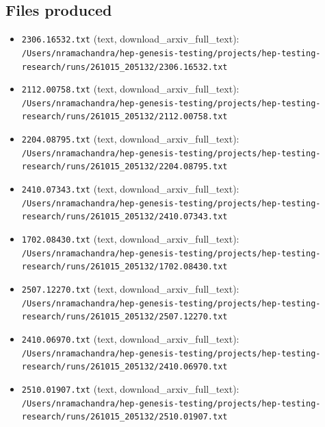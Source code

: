 \documentclass[11pt,a4paper]{article}
\begin{document}
\subsection{Files produced}
\begin{itemize}
  \item \texttt{2306.16532.txt} (text, download\_arxiv\_full\_text): \texttt{/\allowbreak{}Users/\allowbreak{}nramachandra/\allowbreak{}hep-genesis-testing/\allowbreak{}projects/\allowbreak{}hep-testing-research/\allowbreak{}runs/\allowbreak{}261015\_\allowbreak{}205132/\allowbreak{}2306.16532.txt}
  \item \texttt{2112.00758.txt} (text, download\_arxiv\_full\_text): \texttt{/\allowbreak{}Users/\allowbreak{}nramachandra/\allowbreak{}hep-genesis-testing/\allowbreak{}projects/\allowbreak{}hep-testing-research/\allowbreak{}runs/\allowbreak{}261015\_\allowbreak{}205132/\allowbreak{}2112.00758.txt}
  \item \texttt{2204.08795.txt} (text, download\_arxiv\_full\_text): \texttt{/\allowbreak{}Users/\allowbreak{}nramachandra/\allowbreak{}hep-genesis-testing/\allowbreak{}projects/\allowbreak{}hep-testing-research/\allowbreak{}runs/\allowbreak{}261015\_\allowbreak{}205132/\allowbreak{}2204.08795.txt}
  \item \texttt{2410.07343.txt} (text, download\_arxiv\_full\_text): \texttt{/\allowbreak{}Users/\allowbreak{}nramachandra/\allowbreak{}hep-genesis-testing/\allowbreak{}projects/\allowbreak{}hep-testing-research/\allowbreak{}runs/\allowbreak{}261015\_\allowbreak{}205132/\allowbreak{}2410.07343.txt}
  \item \texttt{1702.08430.txt} (text, download\_arxiv\_full\_text): \texttt{/\allowbreak{}Users/\allowbreak{}nramachandra/\allowbreak{}hep-genesis-testing/\allowbreak{}projects/\allowbreak{}hep-testing-research/\allowbreak{}runs/\allowbreak{}261015\_\allowbreak{}205132/\allowbreak{}1702.08430.txt}
  \item \texttt{2507.12270.txt} (text, download\_arxiv\_full\_text): \texttt{/\allowbreak{}Users/\allowbreak{}nramachandra/\allowbreak{}hep-genesis-testing/\allowbreak{}projects/\allowbreak{}hep-testing-research/\allowbreak{}runs/\allowbreak{}261015\_\allowbreak{}205132/\allowbreak{}2507.12270.txt}
  \item \texttt{2410.06970.txt} (text, download\_arxiv\_full\_text): \texttt{/\allowbreak{}Users/\allowbreak{}nramachandra/\allowbreak{}hep-genesis-testing/\allowbreak{}projects/\allowbreak{}hep-testing-research/\allowbreak{}runs/\allowbreak{}261015\_\allowbreak{}205132/\allowbreak{}2410.06970.txt}
  \item \texttt{2510.01907.txt} (text, download\_arxiv\_full\_text): \texttt{/\allowbreak{}Users/\allowbreak{}nramachandra/\allowbreak{}hep-genesis-testing/\allowbreak{}projects/\allowbreak{}hep-testing-research/\allowbreak{}runs/\allowbreak{}261015\_\allowbreak{}205132/\allowbreak{}2510.01907.txt}
\end{itemize}
\end{document}
